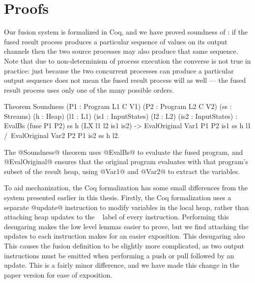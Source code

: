 \section{Proofs}
\label{s:Proofs}

Our fusion system is formalized in Coq, and we have proved soundness of : if the fused result process produces a particular sequence of values on its output channels then the two source processes may also produce that same sequence. Note that due to non-determinism of process execution the converse is not true in practice: just because the two concurrent processes can produce a particular output sequence does not mean the fused result process will as well --- the fused result process uses only one of the many possible orders. 


\begin{code}
Theorem Soundness (P1 : Program L1 C V1) (P2  : Program L2 C V2)
                  (ss : Streams)         (h   : Heap)
                  (l1 : L1)              (is1 : InputStates)
                  (l2 : L2)              (is2 : InputStates) 
  :  EvalBs (fuse P1 P2) ss h (LX l1 l2 is1 is2)
  -> EvalOriginal Var1 P1 P2 is1 ss h l1
  /\ EvalOriginal Var2 P2 P1 is2 ss h l2.
\end{code}

The @Soundness@ theorem uses @EvalBs@ to evaluate the fused program, and @EvalOriginal@ ensures that the original program evaluates with that program's subset of the result heap, using @Var1@ and @Var2@ to extract the variables.


To aid mechanization, the Coq formalization has some small differences from the system presented earlier in this thesis.
Firstly, the Coq formalization uses a separate @update@ instruction to modify variables in the local heap, rather than attaching heap updates to the \Next~ label of every instruction.
Performing this desugaring makes the low level lemmas easier to prove, but we find attaching the updates to each instruction makes for an easier exposition.
This desugaring also 
This causes the fusion definition to be slightly more complicated, as two output instructions must be emitted when performing a push or pull followed by an update. This is a fairly minor difference, and we have made this change in the paper version for ease of exposition.

